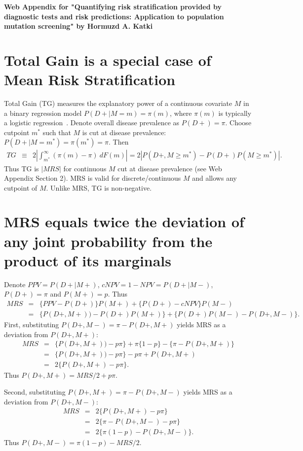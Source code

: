 \documentclass[AMA,STIX1COL]{WileyNJD-v2}
\begin{document}
{\large \bfseries{\noindent Web Appendix for "Quantifying risk stratification provided by diagnostic tests and risk predictions: Application to population mutation screening" by Hormuzd A. Katki}}


\section{Total Gain is a special case of Mean Risk Stratification}
\label{TotalGain}
Total Gain (TG) measures the explanatory power of a continuous covariate $M$ in a binary regression model $P(D+|M=m)=\pi(m)$, where $\pi(m)$ is typically a logistic regression~\citep{bura2001binary}.  Denote overall disease prevalence as $P(D+)=\pi$.  Choose cutpoint $m^*$ such that $M$ is cut at disease prevalence: $P(D+|M=m^*)=\pi(m^*)=\pi$.  Then
\begin{eqnarray*}
	TG &\equiv& 2\left| \int_{m^*}^{\infty} (\pi(m)-\pi)~dF(m) \right| = 2|P(D+,M\ge m^*) - P(D+)P(M\ge m^*)|.
\end{eqnarray*}
Thus TG is $|MRS|$ for continuous $M$ cut at disease prevalence (see Web Appendix Section 2).  MRS is valid for discrete/continuous $M$ and allows any cutpoint of $M$.  Unlike MRS, TG is non-negative.  


\section{MRS equals twice the deviation of any joint probability from the product of its marginals}
\label{sec:4MRSeqns}

Denote $PPV=P(D+|M+)$, $cNPV=1-NPV=P(D+|M-)$, $P(D+)=\pi$ and $P(M+)=p$.  Thus 
\begin{eqnarray*}
	MRS &=& \{PPV-P(D+)\}P(M+) + \{P(D+)-cNPV\}P(M-) \\
	&=& \{P(D+,M+))-P(D+)P(M+)\} + \{P(D+)P(M-)-P(D+,M-)\}.
\end{eqnarray*}
First, substituting $P(D+,M-)=\pi-P(D+,M+)$ yields MRS as a deviation from $P(D+,M+)$:
\begin{eqnarray*}
	MRS &=& \{P(D+,M+))-p\pi\} + \pi\{1-p\} - \{\pi-P(D+,M+)\} \\
	&=& \{P(D+,M+))-p\pi\} - p\pi + P(D+,M+) \\
	&=& 2\{P(D+,M+) - p\pi\}.
\end{eqnarray*}
Thus $P(D+,M+)=MRS/2 + p\pi$.  

Second, substituting $P(D+,M+)=\pi-P(D+,M-)$ yields MRS as a deviation from $P(D+,M-)$:
\begin{eqnarray*}
	MRS &=& 2\{P(D+,M+) - p\pi\} \\
	&=& 2\{\pi-P(D+,M-) - p\pi\} \\
	&=& 2\{\pi(1-p) - P(D+,M-)\}.
\end{eqnarray*}
Thus $P(D+,M-)=\pi(1-p)-MRS/2$.
\end{document}
